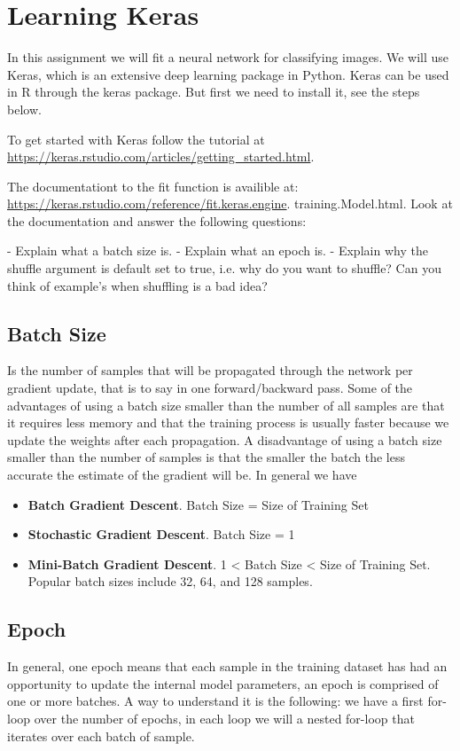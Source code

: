 \section{Learning Keras}
In this assignment we will fit a neural network for classifying images. We will use Keras, which is an extensive deep learning package in Python. Keras can be used in R through the keras package. But first we need to install it, see the steps below.

To get started with Keras follow the tutorial at \url{https://keras.rstudio.com/articles/getting\_started.html}.

The documentationt to the fit function is availible at: \url{https://keras.rstudio.com/reference/fit.keras.engine}. training.Model.html. Look at the documentation and answer the following questions:

- Explain what a batch size is.
- Explain what an epoch is.
- Explain why the shuffle argument is default set to true, i.e. why do you want to shuffle? Can you think of example’s when shuffling is a bad idea?

\subsection{Batch Size}
Is the number of samples that will be propagated through the network per gradient update, that is to say in one forward/backward pass. Some of the advantages of using a batch size smaller than the number of all samples are that it requires less memory and that the training process is usually faster because we update the weights after each propagation. A disadvantage of using a batch size smaller than the number of samples is that the smaller the batch the less accurate the estimate of the gradient will be. In general we have
\begin{itemize}
    \item  \textbf{Batch Gradient Descent}. Batch Size = Size of Training Set
    \item \textbf{Stochastic Gradient Descent}. Batch Size = 1
    \item \textbf{Mini-Batch Gradient Descent}. 1 < Batch Size < Size of Training Set. Popular batch sizes include 32, 64, and 128 samples.
\end{itemize}

\subsection{Epoch}
In general, one epoch means that each sample in the training dataset has had an opportunity to update the internal model parameters, an epoch is comprised of one or more batches. A way to understand it is the following: we have a first for-loop over the number of epochs, in each loop we will a nested for-loop that iterates over each batch of sample.

